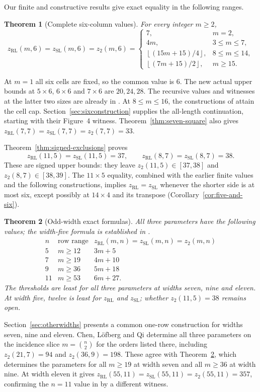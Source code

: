 \documentclass[11pt,a4paper]{article}
\newtheorem{theorem}{Theorem}[section]
\theoremstyle{definition}
\newcommand{\zr}{z_{\mathrm{RL}}}
\newcommand{\zs}{z_{\mathrm{SL}}}
\newcommand{\zt}{z_2}
\newcommand{\fl}[1]{\left\lfloor #1\right\rfloor}
\begin{document}
Our finite and constructive results give exact equality in the following
ranges.
\begin{theorem}[Complete six-column values]\label{thm:six}
For every integer $m\ge2$,
\begin{equation}\label{eq:six}
 \zr(m,6)=\zs(m,6)=\zt(m,6)=
 \begin{cases}
 7,&m=2,\\
 4m,&3\le m\le7,\\
 \fl{(15m+15)/4},&8\le m\le14,\\
 \fl{(7m+15)/2},&m\ge15.
 \end{cases}
\end{equation}
\end{theorem}


At $m=1$ all six cells are fixed, so the common value is $6$.
The new actual upper bounds at $5\times6$, $6\times6$ and $7\times6$
are $20,24,28$. The recursive values and witnesses at the latter two sizes
are already in \cite{CCQ}. At $8\le m\le16$, the constructions of
\cite{CCQ} attain the cell cap. Section~\ref{sec:sixconstruction} supplies
the all-length continuation, starting with their Figure~4 witness.
Theorem~\ref{thm:seven-square} also gives
$\zr(7,7)=\zs(7,7)=\zt(7,7)=33$.

Theorem~\ref{thm:signed-exclusions} proves
\[
 \zr(11,5)=\zs(11,5)=37,\qquad \zr(8,7)=\zs(8,7)=38.
\]
These are signed upper bounds: they leave $\zt(11,5)\in[37,38]$ and
$\zt(8,7)\in[38,39]$. The $11\times5$ equality, combined with the earlier finite values and the
following constructions, implies $\zr=\zs$ whenever the shorter side
is at most six, except possibly at $14\times4$ and its transpose
(Corollary~\ref{cor:five-and-six}).

\begin{theorem}[Odd-width exact formulas]\label{thm:otherwidths}
All three parameters have the following values; the width-five formula
is established in \cite[Theorem~5.4 and Corollary~5.5]{XiChangFive}.
\[
\begin{array}{c|c|c}
 n&\text{row range}&\zr(m,n)=\zs(m,n)=\zt(m,n)\\\hline
 5&m\ge12&3m+5\\
 7&m\ge19&4m+10\\
 9&m\ge36&5m+18\\
 11&m\ge53&6m+27.
\end{array}
\]
The thresholds are least for all three parameters at widths seven, nine
and eleven. At width five, twelve is least for $\zr$ and $\zs$; whether
$\zt(11,5)=38$ remains open.
\end{theorem}
Section~\ref{sec:otherwidths} presents a common one-row construction
for widths seven, nine and eleven.
Chen, L\"ofberg and Qi \cite[Theorem~5.3]{CLQIncidence} determine all
three parameters on the incidence slice $m=\binom n2$ for the orders
listed there, including $\zt(21,7)=94$ and $\zt(36,9)=198$.
These agree with Theorem~\ref{thm:otherwidths}, which determines the
parameters for all $m\ge19$ at width seven and all $m\ge36$ at width nine.
At width eleven it gives $\zr(55,11)=\zs(55,11)=\zt(55,11)=357$,
confirming the $n=11$ value in \cite[Conjecture~4.10]{CLQIncidence}
by a different witness.
\end{document}
